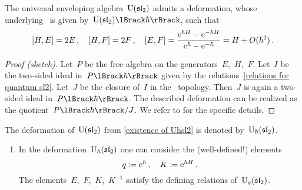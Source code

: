 \documentclass[a4paper, 11pt, oneside]{scrartcl}
\begin{document}
\begin{theorem}
  \label{existence of Uhsl2}
  The universal enveloping algebra~$\operatorname{U}(\mathfrak{sl}_2)$ admits a deformation, whose underlying~\module{$\kfhbar$} is given by~$\power{\Univ(\sllie_2)}{\hbar}$, such that
  \begin{equation}
    \label{relations for quantum sl2}
    [H, E] = 2E \,,
    \quad
    [H, F] = 2F \,,
    \quad
    [E, F]
    =
    \frac{ \mathrm{e}^{\hbar H} - \mathrm{e}^{-\hbar H} }{ \mathrm{e}^{\hbar} - \mathrm{e}^{-\hbar} }
    =
    H + O(\hbar^2) \,.
  \end{equation}
\end{theorem}

\begin{proof}[Proof (sketch)]
  Let~$P$ be the free algebra on the generators~$E$,~$H$,~$F$.
  Let~$I$ be the two-sided ideal in~$\power{P}{\hbar}$ given by the relations~\eqref{relations for quantum sl2}.
  Let~$J$ be the closure of~$I$ in the~\adic{$\hbar$} topology.
  Then~$J$ is again a two-sided ideal in~$\power{P}{\hbar}$.
  The described deformation can be realized as the quotient~$\power{P}{\hbar} / J$.
  We refer to \cite[Definition-Proposition~6.4.3~ff.]{guide_to_quantum_groups} for the specific details.
\end{proof}

\begin{definition}
  The deformation of~$\operatorname{U}(\mathfrak{sl}_2)$ from \cref{existence of Uhsl2} is denoted by~$\operatorname{U}_{\hbar}(\mathfrak{sl}_2)$.
\end{definition}

\begin{remark}
  \leavevmode
  \begin{enumerate}
    \item
      In the deformation~$\operatorname{U}_{\hbar}(\mathfrak{sl}_2)$ one can consider the (well-defined!) elements
      \[
        q \coloneqq \mathrm{e}^{\hbar} \,,
        \quad
        K \coloneqq \mathrm{e}^{\hbar H} \,.
      \]
      The elements~$E$,~$F$,~$K$,~$K^{-1}$ satisfy the defining relations of~$\operatorname{U}_q(\mathfrak{sl}_2)$.
  \end{enumerate}
\end{remark}
\end{document}
